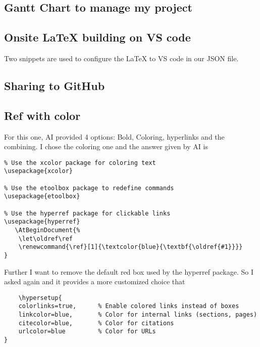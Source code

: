 \subsection{Gantt Chart to manage my project}
\subsection{Onsite LaTeX building on VS code}
Two snippets are used to configure the LaTeX to VS code in our JSON file. \cite{exampleWebsite}
\subsection{Sharing to GitHub}
\subsection{Ref with color}
For this one, AI provided 4 options: Bold, Coloring, hyperlinks and the combining. I chose the coloring one and the answer given by AI is 
\begin{verbatim}
% Use the xcolor package for coloring text
\usepackage{xcolor}

% Use the etoolbox package to redefine commands
\usepackage{etoolbox}

% Use the hyperref package for clickable links
\usepackage{hyperref}
   \AtBeginDocument{%
    \let\oldref\ref
    \renewcommand{\ref}[1]{\textcolor{blue}{\textbf{\oldref{#1}}}}
}
\end{verbatim}
Further I want to remove the default red box used by the hyperref package. So I asked again and it provides a more customized choice that 
\begin{verbatim}
    \hypersetup{
    colorlinks=true,      % Enable colored links instead of boxes
    linkcolor=blue,       % Color for internal links (sections, pages)
    citecolor=blue,       % Color for citations
    urlcolor=blue         % Color for URLs
}
\end{verbatim}